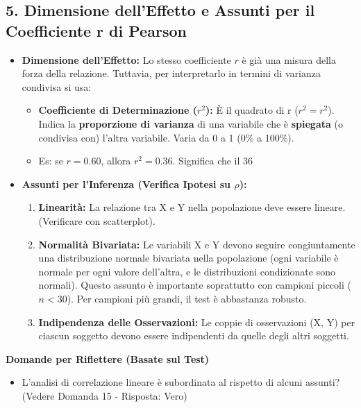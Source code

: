 \documentclass[12pt, a4paper]{article}
\newenvironment{reflectionbox}{%
    \medskip
    \begin{framed}\par\noindent
    \textbf{\color{boxtitlecolor}Domande per Riflettere (Basate sul Test)} \par
    \begin{itemize}[leftmargin=*, label=$\blacktriangleright$]
}{%
    \end{itemize}\par
    \end{framed}
    \medskip
}
\newcommand{\rpearson}{r} %
\newcommand{\poprho}{\rho} %
\newcommand{\rsq}{r^2} %
\begin{document}
\subsection*{5. Dimensione dell'Effetto e Assunti per il Coefficiente r di Pearson}
\begin{itemize}
    \item \textbf{Dimensione dell'Effetto:} Lo stesso coefficiente $\rpearson$ è già una misura della forza della relazione. Tuttavia, per interpretarlo in termini di varianza condivisa si usa:
        \begin{itemize}
            \item \textbf{Coefficiente di Determinazione ($\rsq$):} È il quadrato di r ($\rsq = \rpearson^2$). Indica la \textbf{proporzione di varianza} di una variabile che è \textbf{spiegata} (o condivisa con) l'altra variabile. Varia da 0 a 1 (0\% a 100\%).
            \item Es: se $r = 0.60$, allora $\rsq = 0.36$. Significa che il 36%
        \end{itemize}
    \item \textbf{Assunti per l'Inferenza (Verifica Ipotesi su $\poprho$):}
        \begin{enumerate}
            \item \textbf{Linearità:} La relazione tra X e Y nella popolazione deve essere lineare. (Verificare con scatterplot).
            \item \textbf{Normalità Bivariata:} Le variabili X e Y devono seguire congiuntamente una distribuzione normale bivariata nella popolazione (ogni variabile è normale per ogni valore dell'altra, e le distribuzioni condizionate sono normali). Questo assunto è importante soprattutto con campioni piccoli ($n < 30$). Per campioni più grandi, il test è abbastanza robusto.
            \item \textbf{Indipendenza delle Osservazioni:} Le coppie di osservazioni (X, Y) per ciascun soggetto devono essere indipendenti da quelle degli altri soggetti.
        \end{enumerate}
\end{itemize}

\begin{reflectionbox}
    \item L'analisi di correlazione lineare è subordinata al rispetto di alcuni assunti? (Vedere Domanda 15 - Risposta: Vero)
\end{reflectionbox}
\end{document}
